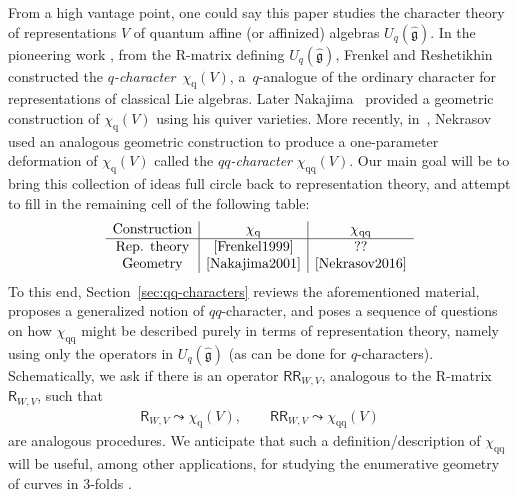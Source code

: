 \documentclass[pdftex]{sigma}%
\numberwithin{equation}{section}
\renewcommand{\hat}[1]{\widehat{#1}}
\newcommand{\lie}[1]{\mathfrak{#1}}
\newcommand{\sR}{\mathsf{R}}
\newcommand{\sRR}{\mathsf{RR}}
\newcommand{\chiq}{\chi_{\mathrm{q}}}
\newcommand{\chiqq}{\chi_{\mathrm{qq}}}
\begin{document}
From a high vantage point, one could say this paper studies the
character theory of representations $V$ of quantum affine (or
affinized) algebras $U_q(\hat{\lie{g}})$. In the pioneering work
\cite{Frenkel1999}, from the R-matrix defining $U_q(\hat{\lie{g}})$,
Frenkel and Reshetikhin constructed the {\it $q$-character}~$\chiq(V)$, a~$q$-analogue of the ordinary character for
representations of classical Lie algebras. Later Nakajima~\cite{Nakajima2001} provided a geometric construction of $\chiq(V)$
using his quiver varieties. More recently, in~\cite{Nekrasov2016},
Nekrasov used an analogous geometric construction to produce a
one-parameter deformation of $\chiq(V)$ called the {\it
 $qq$-character} $\chiqq(V)$. Our main goal will be to bring this
collection of ideas full circle back to representation theory, and
attempt to fill in the remaining cell of the following table:
\[ \begin{array}{c|c|c}
 \text{Construction} & \chiq & \chiqq \\ \hline
 \text{Rep. theory} & \cite{Frenkel1999} & ?? \\
 \text{Geometry} & \cite{Nakajima2001} & \cite{Nekrasov2016}
 \end{array} \]
To this end, Section~\ref{sec:qq-characters} reviews the aforementioned
material, proposes a generalized notion of $qq$-character, and poses a
sequence of questions on how $\chiqq$ might be described purely in
terms of representation theory, namely using only the operators in
$U_q(\hat{\lie{g}})$ (as can be done for $q$-characters).
Schematically, we ask if there is an operator $\sRR_{W,V}$, analogous
to the R-matrix $\sR_{W,V}$, such that
\begin{gather} \label{eq:R-vs-RR-analogy}
 \sR_{W,V}\leadsto \chiq(V), \qquad
\sRR_{W,V}\leadsto \chiqq(V)
\end{gather}
are analogous procedures. We anticipate that such a
definition/description of $\chiqq$ will be useful, among other
applications, for studying the enumerative geometry of curves in
3-folds \cite{Liu2021}.
\end{document}
